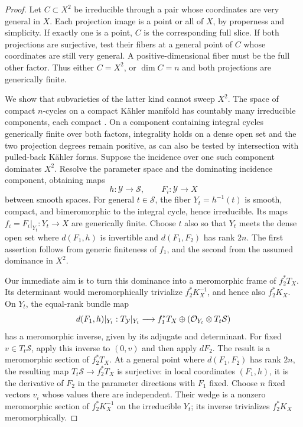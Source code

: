 \begin{proof}
Let \(C\subset X^2\) be irreducible through a pair whose coordinates are
very general in \(X\).  Each projection image is a point or all of \(X\),
by properness and simplicity.  If exactly one is a point, \(C\) is the
corresponding full slice.  If both projections are surjective, test their
fibers at a general point of \(C\) whose coordinates are still very
general.  A positive-dimensional fiber must be the full other factor.
Thus either \(C=X^2\), or \(\dim C=n\) and both projections are
generically finite.

We show that subvarieties of the latter kind cannot sweep \(X^2\).
The space of compact \(n\)-cycles on a compact Kähler manifold has
countably many irreducible components, each compact
\cite[Theorem~1.1]{LiebermanCycles}.  On a component containing integral cycles
generically finite over both factors, integrality holds on a dense open
set and the two projection degrees remain positive, as can also be
tested by intersection with pulled-back Kähler forms.  Suppose the
incidence over one such component dominates \(X^2\).  Resolve the
parameter space and the dominating incidence component, obtaining maps
\[
 h:\mathcal Y\longrightarrow\mathcal S,\qquad
 F_i:\mathcal Y\longrightarrow X
\]
between smooth spaces.  For general \(t\in\mathcal S\), the fiber
\(Y_t=h^{-1}(t)\) is smooth, compact, and bimeromorphic to the integral
cycle, hence irreducible.  Its maps \(f_i=F_i|_{Y_t}:Y_t\to X\) are
generically finite.  Choose \(t\) also so that \(Y_t\) meets the dense
open set where \(d(F_1,h)\) is invertible and \(d(F_1,F_2)\) has rank
\(2n\).  The first assertion follows from generic finiteness of \(f_1\),
and the second from the assumed dominance in \(X^2\).

Our immediate aim is to turn this dominance into a meromorphic frame of
\(f_2^*T_X\).  Its determinant would meromorphically trivialize
\(f_2^*K_X^{-1}\), and hence also \(f_2^*K_X\).
On \(Y_t\), the equal-rank bundle map
\[
 d(F_1,h)|_{Y_t}:T_{\mathcal Y}|_{Y_t}
    \longrightarrow f_1^*T_X\oplus
                    (\mathcal O_{Y_t}\otimes T_t\mathcal S)
\]
has a meromorphic inverse, given by its adjugate and determinant.
For fixed \(v\in T_t\mathcal S\), apply this inverse to \((0,v)\)
and then apply \(dF_2\).  The result is a meromorphic section of
\(f_2^*T_X\).  At a general point where \(d(F_1,F_2)\) has rank
\(2n\), the resulting map \(T_t\mathcal S\to f_2^*T_X\) is
surjective: in local coordinates \((F_1,h)\), it is the derivative
of \(F_2\) in the parameter directions with \(F_1\) fixed.  Choose
\(n\) fixed vectors \(v_i\) whose values there are independent.
Their wedge is a nonzero meromorphic section of \(f_2^*K_X^{-1}\)
on the irreducible \(Y_t\); its inverse trivializes \(f_2^*K_X\)
meromorphically.


\end{proof}
